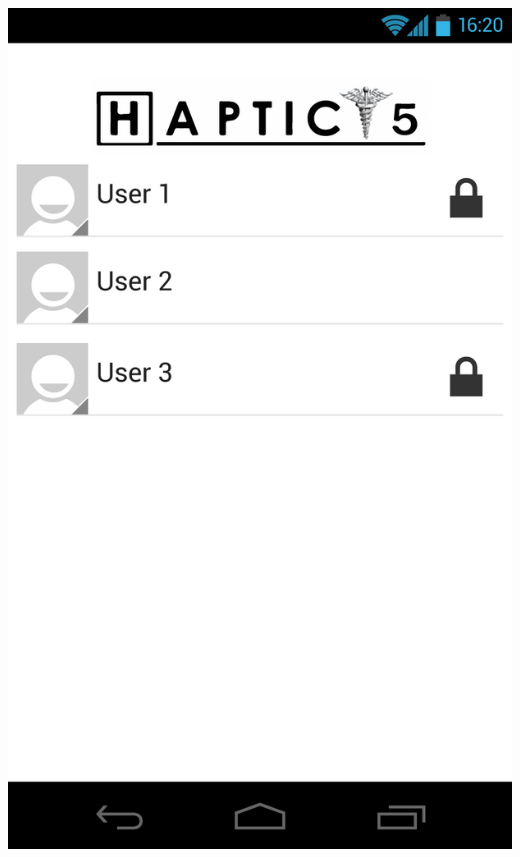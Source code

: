 \documentclass[pdftex,12pt,a4paper]{report}
\begin{document}
\includegraphics[scale=0.18]{Screens/01-Home---Change-User.png}
\end{document}

